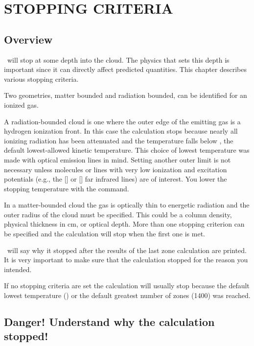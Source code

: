 \chapter{STOPPING CRITERIA}
\label{sec:StoppingCriteria}

\section{Overview}

\Cloudy\ will stop at some depth into the cloud.
The physics that sets
this depth is important since it can directly affect predicted quantities.
This chapter describes various stopping criteria.

Two geometries, matter bounded and radiation bounded, can be identified
for an ionized gas.

A radiation-bounded cloud is one where the outer edge of the emitting
gas is a hydrogen ionization front.
In this case the calculation stops
because nearly all ionizing radiation has been attenuated and the temperature
falls below \TEMPSTOPDEFAULT, the default lowest-allowed kinetic temperature.
This
choice of lowest temperature was made with optical emission lines in mind.
Setting another outer limit is not necessary unless molecules or lines with
very low ionization and excitation potentials (e.g., the [\cii] or [\oi]
far infrared lines) are of interest.
You lower
the stopping temperature with the  command.

In a matter-bounded cloud the gas is optically thin to energetic radiation
and the outer radius of the cloud must be specified.
This could be a column
density, physical thickness in cm, or optical depth.
More than one stopping
criterion can be specified and the calculation will stop when the first
one is met.

\Cloudy\ will say why it stopped after the results of the last zone
calculation are printed.
It is very important to make sure that the
calculation stopped for the reason you intended.

If no stopping criteria are set the calculation will usually stop because
the default lowest temperature (\TEMPSTOPDEFAULT) or the default greatest number of
zones (1400) was reached.

\section{Danger!  Understand why the calculation stopped!}

